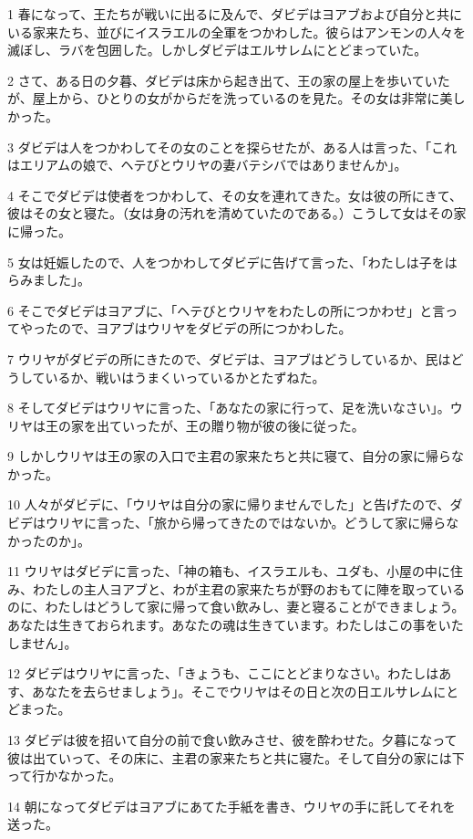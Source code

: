 \par 1 春になって、王たちが戦いに出るに及んで、ダビデはヨアブおよび自分と共にいる家来たち、並びにイスラエルの全軍をつかわした。彼らはアンモンの人々を滅ぼし、ラバを包囲した。しかしダビデはエルサレムにとどまっていた。
\par 2 さて、ある日の夕暮、ダビデは床から起き出て、王の家の屋上を歩いていたが、屋上から、ひとりの女がからだを洗っているのを見た。その女は非常に美しかった。
\par 3 ダビデは人をつかわしてその女のことを探らせたが、ある人は言った、「これはエリアムの娘で、ヘテびとウリヤの妻バテシバではありませんか」。
\par 4 そこでダビデは使者をつかわして、その女を連れてきた。女は彼の所にきて、彼はその女と寝た。（女は身の汚れを清めていたのである。）こうして女はその家に帰った。
\par 5 女は妊娠したので、人をつかわしてダビデに告げて言った、「わたしは子をはらみました」。
\par 6 そこでダビデはヨアブに、「ヘテびとウリヤをわたしの所につかわせ」と言ってやったので、ヨアブはウリヤをダビデの所につかわした。
\par 7 ウリヤがダビデの所にきたので、ダビデは、ヨアブはどうしているか、民はどうしているか、戦いはうまくいっているかとたずねた。
\par 8 そしてダビデはウリヤに言った、「あなたの家に行って、足を洗いなさい」。ウリヤは王の家を出ていったが、王の贈り物が彼の後に従った。
\par 9 しかしウリヤは王の家の入口で主君の家来たちと共に寝て、自分の家に帰らなかった。
\par 10 人々がダビデに、「ウリヤは自分の家に帰りませんでした」と告げたので、ダビデはウリヤに言った、「旅から帰ってきたのではないか。どうして家に帰らなかったのか」。
\par 11 ウリヤはダビデに言った、「神の箱も、イスラエルも、ユダも、小屋の中に住み、わたしの主人ヨアブと、わが主君の家来たちが野のおもてに陣を取っているのに、わたしはどうして家に帰って食い飲みし、妻と寝ることができましょう。あなたは生きておられます。あなたの魂は生きています。わたしはこの事をいたしません」。
\par 12 ダビデはウリヤに言った、「きょうも、ここにとどまりなさい。わたしはあす、あなたを去らせましょう」。そこでウリヤはその日と次の日エルサレムにとどまった。
\par 13 ダビデは彼を招いて自分の前で食い飲みさせ、彼を酔わせた。夕暮になって彼は出ていって、その床に、主君の家来たちと共に寝た。そして自分の家には下って行かなかった。
\par 14 朝になってダビデはヨアブにあてた手紙を書き、ウリヤの手に託してそれを送った。
